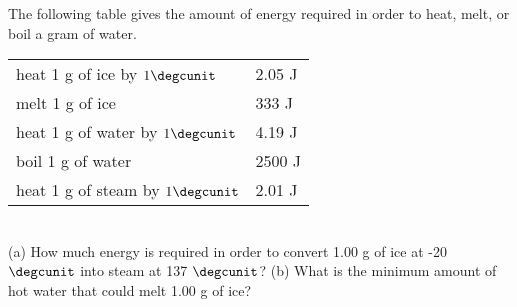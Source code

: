         The following table gives the amount of energy required in order to
        heat, melt, or boil a gram of water.\\
        \begin{tabular}{ll}
        heat 1 g of ice by $1\degcunit$        & 2.05 J\\
        melt 1 g of ice                        & 333 J\\
        heat 1 g of water by $1\degcunit$ &         4.19 J\\
        boil 1 g of water                & 2500 J\\
        heat 1 g of steam by $1\degcunit$        & 2.01 J\\
        \end{tabular}\\
        (a) How much energy is required in order to convert 1.00 g of
        ice at -20 $\degcunit$ into steam at 137 $\degcunit$? \answercheck\hwendpart
        (b) What is the minimum amount of hot water that could melt 1.00 g
        of ice? \answercheck
